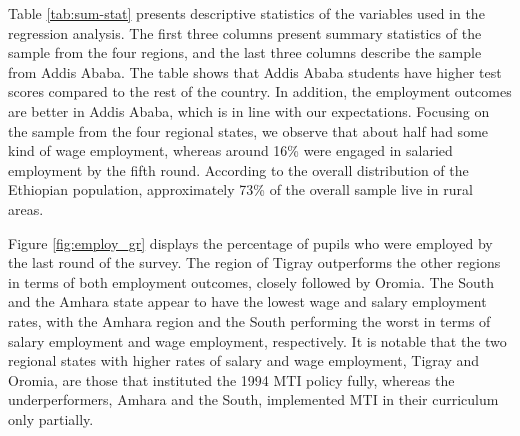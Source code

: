 Table \ref{tab:sum-stat} presents descriptive statistics of the variables used in the regression analysis. The first three columns present summary statistics of the sample from the four regions, and the last three columns describe the sample from Addis Ababa.  The table shows that Addis Ababa students have higher test scores compared to the rest of the country. In addition, the employment outcomes are better in Addis Ababa, which is in line with our expectations. Focusing on the sample from the four regional states, we observe that about half had some kind of wage employment, whereas around 16\% were engaged in salaried employment by the fifth round. According to the overall distribution of the Ethiopian population, approximately 73\% of the overall sample live in rural areas.

Figure \ref{fig:employ_gr} displays the percentage of pupils who were employed by the last round of the survey. The region of Tigray outperforms the other regions in terms of both employment outcomes, closely followed by Oromia. The South and the Amhara state appear to have the lowest wage and salary employment rates, with the Amhara region and the South performing the worst in terms of salary employment and wage employment, respectively. It is notable that the two regional states with higher rates of salary and wage employment, Tigray and Oromia, are those that instituted the 1994 MTI policy fully, whereas the underperformers, Amhara and the South, implemented MTI in their curriculum only partially. 



